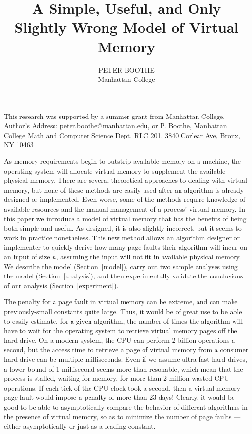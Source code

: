 \documentclass{acmtrans2m}
\title{A Simple, Useful, and Only Slightly Wrong Model of Virtual Memory}
\author{PETER BOOTHE\\
Manhattan College
}
\begin{document}
 
\begin{bottomstuff} 
This research was supported by a summer grant from Manhattan College.\\
Author's Address: \url{peter.boothe@manhattan.edu}, or P. Boothe, Manhattan College Math and Computer Science Dept. RLC 201, 3840 Corlear Ave, Bronx, NY 10463
\end{bottomstuff} 
\maketitle 


As memory requirements begin to outstrip available memory on a machine, the
operating system will allocate virtual memory to supplement the available
physical memory.  There are several theoretical approaches to dealing with
virtual memory, but none of these methods are easily used after an algorithm is
already designed or implemented.  Even worse, some of the methods require
knowledge of available resources and the manual management of a process'
virtual memory.  In this paper we introduce a model of virtual memory that has
the benefits of being both simple and useful.  As designed, it is also slightly
incorrect, but it seems to work in practice nonetheless.  This new method
allows an algorithm designer or implementer to quickly derive how many page
faults their algorithm will incur on an input of size $n$, assuming the input
will not fit in available physical memory.  We describe the model
(Section~\ref{model}), carry out two sample analyses using the model
(Section~\ref{analysis}), and then experimentally validate the conclusions of
our analysis (Section~\ref{experiment}). 

The penalty for a page fault in virtual memory can be extreme, and can make
previously-small constants quite large. Thus, it would be of great use to be
able to easily estimate, for a given algorithm, the number of times the
algorithm will have to wait for the operating system to retrieve virtual memory
pages off the hard drive.  On a modern system, the CPU can perform 2 billion
operations a second, but the access time to retrieve a page of virtual memory
from a consumer hard drive can be multiple milliseconds.  Even if we assume
ultra-fast hard drives, a lower bound of 1 millisecond seems more than
resonable, which mean that the process is stalled, waiting for memory, for more
than 2 million wasted CPU operations.  If each tick of the CPU clock took a
second, then a virtual memory page fault would impose a penalty of more than 23
days!  Clearly, it would be good to be able to asymptotically compare the
behavior of different algorithms in the presence of virtual memory, so as to
minimize the number of page faults --- either asymptotically or just as a leading constant\cite{queue}. 
\end{document}
